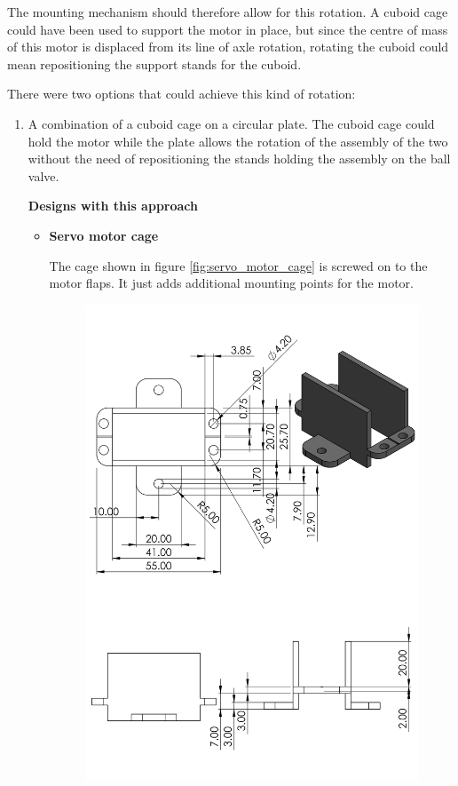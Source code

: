 \begin{enumerate}
\begin{enumerate}
    \par
    The mounting mechanism should therefore allow for this rotation. A cuboid cage could have been used to support the motor in place, but since the centre of mass of this motor is displaced from its line of axle rotation, rotating the cuboid could mean repositioning the support stands for the cuboid.
    \par
     There were two options that could achieve this kind of rotation:
     \begin{enumerate}
         \item A combination of a cuboid cage on a circular plate. The cuboid cage could hold the motor while the plate allows the rotation of the assembly of the two without the need of repositioning the stands holding the assembly on the ball valve.
         \par
         \textbf{Designs with this approach}
         \par
         \begin{itemize}
             \item \textbf{Servo motor cage}
            \par
            The cage shown in figure \ref{fig:servo_motor_cage} is screwed on to the motor flaps. It just adds additional mounting points for the motor. 
            \begin{figure}[H]
                \centering
                \includegraphics[height=.75\textheight]{Figures/ServoMotorHolder.PNG}

\end{figure}
\end{itemize}
\end{enumerate}
\end{enumerate}
\end{enumerate}
